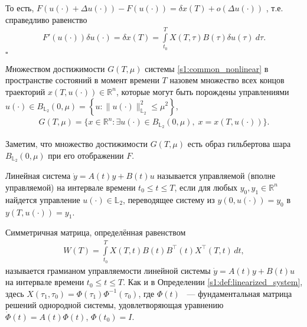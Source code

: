 \documentclass[../main.tex]{subfiles}
\begin{document}
То есть, $F(u(\cdot) + \Delta u(\cdot)) - F(u(\cdot)) = \delta x(T) + o(\Delta u(\cdot))$ , т.е.  справедливо равенство
\begin{gather}\label{s1:lem2_assert}
    F'(u(\cdot))\delta u(\cdot) =\delta x(T) = \int\limits_{t_0}^{T} X(T, \tau) B(\tau) \delta u(\tau) \ d\tau.
\end{gather}
\hfill $\square$
    
\begin{definition}
    {\textit  Множеством достижимости} $ G(T,\mu) $ системы \eqref{s1:common_nonlinear} в пространстве состояний в момент времени $ T $ назовем множество всех концов траекторий $ x(T, u(\cdot)) \in \mathbb{R}^n $,  которые могут быть порождены управлениями $ u(\cdot) \in B_{\mathbb{L}_2}(0,\mu) =\left\lbrace u:\lVert u(\cdot)\rVert^2_{\mathbb{L}_2} \leqslant \mu^2\right\rbrace  $,
    \begin{gather*}
        G(T,\mu)=\{x\in \mathbb{R}^n:\exists u(\cdot)\in B_{\mathbb{L}_2}(0,\mu),\; x=x(T,u(\cdot))\}.
    \end{gather*}
\end{definition}
    
Заметим, что множество достижимости $G(T,\mu)$ есть образ гильбертова шара $B_{\mathbb{L}_2}(0,\mu)$ при его отображении $F$.
   
\begin{definition}
	Линейная система $\dot{y} = A(t) y + B(t) u $ называется управляемой (вполне управляемой) на интервале времени $  t_0 \leqslant t \leqslant T $,  если для любых $y_0, y_1 \in \mathbb{R}^n$ найдется управление $u(\cdot) \in \mathbb{L}_2$, переводящее систему из $y(0, u(\cdot)) = y_0 $ в $y(T, u(\cdot)) = y_1 $.
\end{definition}
   
\begin{definition}\label{s1:def:grammian}
    Симметричная матрица, определённая равенством
    \begin{gather*}
        W(T) = \int\limits_{t_0}^{T}X(T,t)B(t)B^{\top}(t)X^{\top}(T,t) \, dt,
    \end{gather*}
    называется грамианом управляемости линейной системы $\dot{y} = A(t) y + B(t) u $ на интервале времени $  t_0 \leqslant t \leqslant T $.
    Как и в Определении \ref{s1:def:linearized_system}, здесь $ X(\tau_1,\tau_0)= \Phi(\tau_1) \Phi^{-1}(\tau_0) $, где $\Phi(t) $ ~--- фундаментальная матрица решений однородной системы, удовлетворяющая уравнению $ \dot{\Phi}(t) = A(t) \Phi(t)$, $ \Phi(t_0) = I $.
\end{definition}
    
\end{document}

